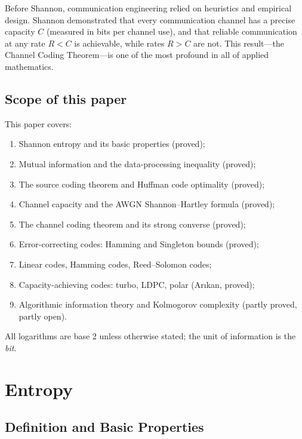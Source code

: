 \documentclass[12pt,a4paper]{amsart}
\theoremstyle{definition}
\theoremstyle{remark}
\begin{document}
Before Shannon, communication engineering relied on heuristics and empirical
design. Shannon demonstrated that every communication channel has a precise
capacity $C$ (measured in bits per channel use), and that reliable communication
at any rate $R < C$ is achievable, while rates $R > C$ are not. This result—the
Channel Coding Theorem—is one of the most profound in all of applied mathematics.

\subsection*{Scope of this paper}

This paper covers:
\begin{enumerate}[label=(\arabic*)]
  \item Shannon entropy and its basic properties (proved);
  \item Mutual information and the data-processing inequality (proved);
  \item The source coding theorem and Huffman code optimality (proved);
  \item Channel capacity and the AWGN Shannon--Hartley formula (proved);
  \item The channel coding theorem and its strong converse (proved);
  \item Error-correcting codes: Hamming and Singleton bounds (proved);
  \item Linear codes, Hamming codes, Reed--Solomon codes;
  \item Capacity-achieving codes: turbo, LDPC, polar (Ar\i{}kan, proved);
  \item Algorithmic information theory and Kolmogorov complexity (partly proved,
        partly open).
\end{enumerate}

All logarithms are base 2 unless otherwise stated; the unit of information is
the \emph{bit}.

\section{Entropy}

\subsection{Definition and Basic Properties}
\end{document}
